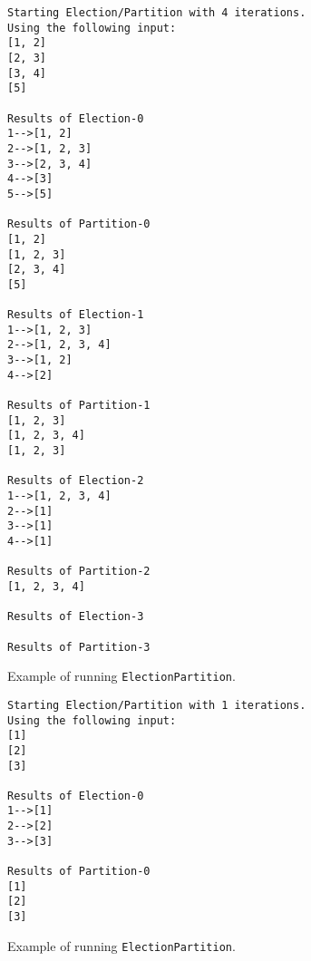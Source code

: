 \documentclass{article}[12pt]
\numberwithin{figure}{section}
\begin{document}
\begin{figure}
\begin{verbatim}
Starting Election/Partition with 4 iterations.
Using the following input: 
[1, 2]
[2, 3]
[3, 4]
[5]

Results of Election-0
1-->[1, 2]
2-->[1, 2, 3]
3-->[2, 3, 4]
4-->[3]
5-->[5]

Results of Partition-0
[1, 2]
[1, 2, 3]
[2, 3, 4]
[5]

Results of Election-1
1-->[1, 2, 3]
2-->[1, 2, 3, 4]
3-->[1, 2]
4-->[2]

Results of Partition-1
[1, 2, 3]
[1, 2, 3, 4]
[1, 2, 3]

Results of Election-2
1-->[1, 2, 3, 4]
2-->[1]
3-->[1]
4-->[1]

Results of Partition-2
[1, 2, 3, 4]

Results of Election-3

Results of Partition-3
\end{verbatim}
\caption{Example of running \texttt{ElectionPartition}.}
\label{fig:election-partition-example1}
\end{figure}

\begin{figure}
\begin{verbatim}
Starting Election/Partition with 1 iterations.
Using the following input: 
[1]
[2]
[3]

Results of Election-0
1-->[1]
2-->[2]
3-->[3]

Results of Partition-0
[1]
[2]
[3]
\end{verbatim}
\caption{Example of running \texttt{ElectionPartition}.}
\label{fig:election-partition-example2}
\end{figure}


 
\end{document}

